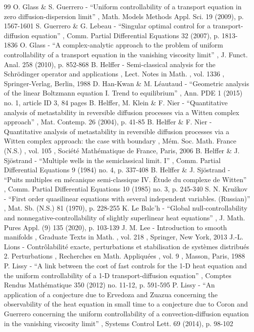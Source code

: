 \documentclass[11pt]{article}
\numberwithin{equation}{section}
\begin{document}
\begin{thebibliography}{99}
 O. Glass \& S. Guerrero - “Uniform controllability of a transport equation in zero diffusion-dispersion limit” , Math. Models Methods Appl. Sci. 19 (2009), p. 1567-1601
 S. Guerrero \& G. Lebeau - “Singular optimal control for a transport-diffusion equation” , Comm. Partial Differential Equations 32 (2007), p. 1813-1836
 O. Glass - “A complex-analytic approach to the problem of uniform controllability of a transport equation in the vanishing viscosity limit” , J. Funct. Anal. 258 (2010), p. 852-868
 B. Helffer - Semi-classical analysis for the Schrödinger operator and applications , Lect. Notes in Math. , vol. 1336 , Springer-Verlag, Berlin, 1988
 D. Han-Kwan \& M. Léautaud - “Geometric analysis of the linear Boltzmann equation I. Trend to equilibrium” , Ann. PDE 1 (2015) no. 1, article ID 3, 84 pages
 B. Helffer, M. Klein \& F. Nier - “Quantitative analysis of metastability in reversible diffusion processes via a Witten complex approach” , Mat. Contemp. 26 (2004), p. 41-85
 B. Helffer \& F. Nier - Quantitative analysis of metastability in reversible diffusion processes via a Witten complex approach: the case with boundary , Mém. Soc. Math. France (N.S.) , vol. 105 , Société Mathématique de France, Paris, 2006
 B. Helffer \& J. Sjöstrand - “Multiple wells in the semiclassical limit. I” , Comm. Partial Differential Equations 9 (1984) no. 4, p. 337-408
 B. Helffer \& J. Sjöstrand - “Puits multiples en mécanique semi-classique IV. Étude du complexe de Witten” , Comm. Partial Differential Equations 10 (1985) no. 3, p. 245-340
 S. N. Kružkov - “First order quasilinear equations with several independent variables. (Russian)” , Mat. Sb. (N.S.) 81 (1970), p. 228-255
 K. Le Balc’h - “Global null-controllability and nonnegative-controllability of slightly superlinear heat equations” , J. Math. Pures Appl. (9) 135 (2020), p. 103-139
 J. M. Lee - Introduction to smooth manifolds , Graduate Texts in Math. , vol. 218 , Springer, New York, 2013
 J.-L. Lions - Contrôlabilité exacte, perturbations et stabilisation de systèmes distribués 2. Perturbations , Recherches en Math. Appliquées , vol. 9 , Masson, Paris, 1988
 P. Lissy - “A link between the cost of fast controls for the 1-D heat equation and the uniform controllability of a 1-D transport-diffusion equation” , Comptes Rendus Mathématique 350 (2012) no. 11-12, p. 591-595
 P. Lissy - “An application of a conjecture due to Ervedoza and Zuazua concerning the observability of the heat equation in small time to a conjecture due to Coron and Guerrero concerning the uniform controllability of a convection-diffusion equation in the vanishing viscosity limit” , Systems Control Lett. 69 (2014), p. 98-102

\end{thebibliography}
\end{document}
